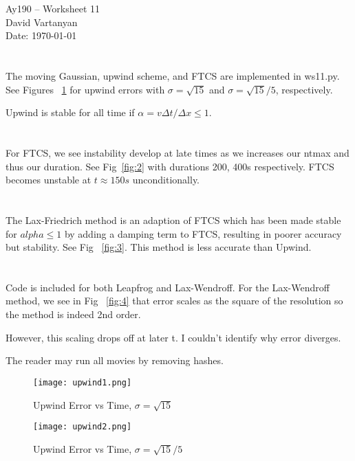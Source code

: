 \documentclass[11pt,letterpaper]{article}
\begin{document}
\begin{center}
\Large
Ay190 -- Worksheet 11\\
David Vartanyan\\
Date: \today
\end{center}

\section{}

The moving Gaussian, upwind scheme, and FTCS are implemented in ws11.py. See Figures  ~\ref{fig:1} for upwind errors with $\sigma=\sqrt{15}$ and $\sigma=\sqrt{15}/5$, respectively.

Upwind is stable for all time if $\alpha = v \Delta t/\Delta x \leqslant 1$. 
\section{}
For FTCS, we see instability develop at late times as we increases our ntmax and thus our duration. See Fig~\ref{fig:2} with durations 200, 400s respectively. FTCS becomes unstable at $t \approx 150s$ unconditionally.

\section{}
The Lax-Friedrich method is an adaption of FTCS which has been made stable for $alpha \leqslant 1$ by adding a damping term to FTCS, resulting in poorer accuracy but stability. See Fig ~\ref{fig:3}. This method is less accurate than Upwind.

\section{}
Code is included for both Leapfrog and Lax-Wendroff.
For the Lax-Wendroff method, we see in Fig ~\ref{fig:4} that error scales as the square of the resolution so the method is indeed 2nd order.

However, this scaling drops off at later t. I couldn't identify why error diverges.

The reader may run all movies by removing hashes. 

\begin{figure}[bth]
\centering
\texttt{[image: upwind1.png]}
\caption{Upwind Error vs Time, $\sigma=\sqrt{15}$}
\texttt{[image: upwind2.png]}
\caption{Upwind Error vs Time, $\sigma=\sqrt{15}/5$}
\label{fig:1}
\end{figure}
\end{document}
